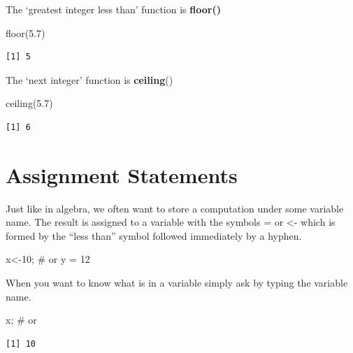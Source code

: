 \documentclass[
  letterpaper,
  DIV=11,
  numbers=noendperiod]{scrreprt}
\newenvironment{Shaded}{\begin{snugshade}}{\end{snugshade}}
\newcommand{\CommentTok}[1]{\textcolor[rgb]{0.37,0.37,0.37}{#1}}
\newcommand{\DecValTok}[1]{\textcolor[rgb]{0.68,0.00,0.00}{#1}}
\newcommand{\FloatTok}[1]{\textcolor[rgb]{0.68,0.00,0.00}{#1}}
\newcommand{\FunctionTok}[1]{\textcolor[rgb]{0.28,0.35,0.67}{#1}}
\newcommand{\NormalTok}[1]{\textcolor[rgb]{0.00,0.23,0.31}{#1}}
\newcommand{\OtherTok}[1]{\textcolor[rgb]{0.00,0.23,0.31}{#1}}
\begin{document}
The `greatest integer less than' function is \textbf{floor()}

\begin{Shaded}
\begin{Highlighting}[]
\FunctionTok{floor}\NormalTok{(}\FloatTok{5.7}\NormalTok{)}
\end{Highlighting}
\end{Shaded}

\begin{verbatim}
[1] 5
\end{verbatim}

The `next integer' function is \textbf{ceiling}()

\begin{Shaded}
\begin{Highlighting}[]
\FunctionTok{ceiling}\NormalTok{(}\FloatTok{5.7}\NormalTok{)}
\end{Highlighting}
\end{Shaded}

\begin{verbatim}
[1] 6
\end{verbatim}

\hypertarget{assignment-statements}{%
\section{Assignment Statements}\label{assignment-statements}}

Just like in algebra, we often want to store a computation under some
variable name. The result is assigned to a variable with the symbols =
or \textless- which is formed by the ``less than'' symbol followed
immediately by a hyphen.

\begin{Shaded}
\begin{Highlighting}[]
\NormalTok{x}\OtherTok{\textless{}{-}}\DecValTok{10}\NormalTok{; }\CommentTok{\# or}
\NormalTok{y }\OtherTok{=} \DecValTok{12}
\end{Highlighting}
\end{Shaded}

When you want to know what is in a variable simply ask by typing the
variable name.

\begin{Shaded}
\begin{Highlighting}[]
\NormalTok{x; }\CommentTok{\# or}
\end{Highlighting}
\end{Shaded}

\begin{verbatim}
[1] 10
\end{verbatim}
\end{document}
